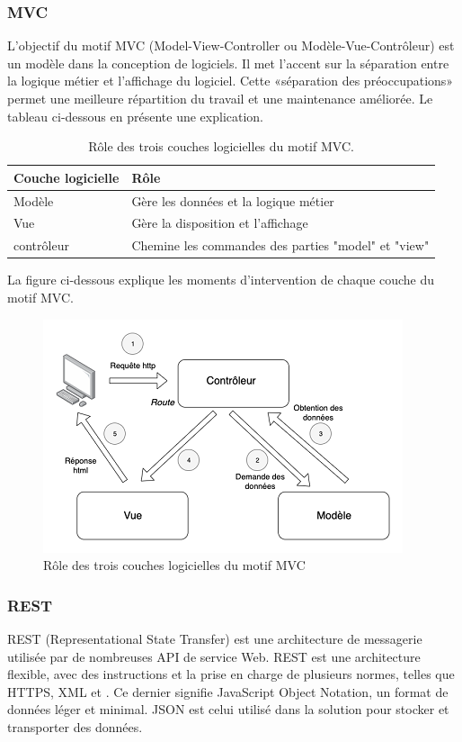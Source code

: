 \subsubsection{MVC}
\label{3.3.3.1}
L'objectif du motif \gls{MVC} (Model-View-Controller ou Modèle-Vue-Contrôleur) est un modèle dans la conception de logiciels. Il met l'accent sur la séparation entre la logique métier et l'affichage du logiciel. Cette «séparation des préoccupations» permet une meilleure répartition du travail et une maintenance améliorée. Le tableau ci-dessous en présente une explication.
\newline\newline
\begin{table}[h]
\begin{tabular}{|m{6cm}|m{10cm}|}
	\hline
	\textbf{Couche logicielle} & \textbf{Rôle} \\
	\hline
	Modèle & Gère les données et la logique métier \\
	\hline
	Vue & Gère la disposition et l'affichage \\
	\hline
	contrôleur & Chemine les commandes des parties "model" et "view" \\
	\hline
\end{tabular}
\caption{Rôle des trois couches logicielles du motif MVC.}
\end{table}
\newline
La figure ci-dessous explique les moments d'intervention de chaque couche du motif \gls{MVC}.
\begin{figure}[h]
	\includegraphics{Images/Modèle-vue-contrôleur_(MVC)_-_fr}
	\centering
	\caption{Rôle des trois couches logicielles du motif MVC}
\end{figure}

\subsubsection{REST}
REST (Representational State Transfer) est une architecture de messagerie utilisée par de nombreuses \gls{API} de service Web. REST est une architecture flexible, avec des instructions et la prise en charge de plusieurs normes, telles que \gls{HTTPS}, XML et . Ce dernier signifie JavaScript Object Notation, un format de données léger et minimal. \gls{JSON} est celui utilisé dans la solution pour stocker et transporter des données.

